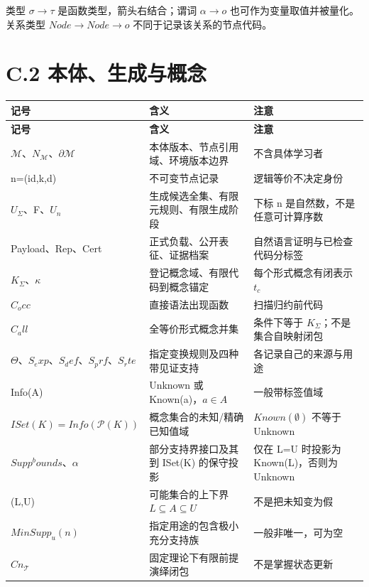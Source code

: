 \documentclass[UTF8,a4paper,zihao=-4,fontset=windows,openany]{ctexbook}
\def\mathrm#1{#1}%
\begin{document}
类型 \(\sigma\to\tau\) 是函数类型，箭头右结合；谓词 \(\alpha\to o\) 也可作为变量取值并被量化。关系类型 \(\mathrm{Node}\to\mathrm{Node}\to o\) 不同于记录该关系的节点代码。

\section{C.2 本体、生成与概念}
\begingroup\small\setlength{\tabcolsep}{4pt}
\begin{longtable}{>{\raggedright\arraybackslash}p{}>{\raggedright\arraybackslash}p{}>{\raggedright\arraybackslash}p{}}
\toprule
\textbf{记号} & \textbf{含义} & \textbf{注意} \\
\midrule
\endfirsthead
\toprule
\textbf{记号} & \textbf{含义} & \textbf{注意} \\
\midrule
\endhead
\bottomrule
\endfoot
\bottomrule
\endlastfoot
\(\mathcal{M}\)、\(N_\mathcal{M}\)、\(\partial\mathcal{M}\) & 本体版本、节点引用域、环境版本边界 & 不含具体学习者 \\
n=(id,k,d) & 不可变节点记录 & 逻辑等价不决定身份 \\
\(U_\Sigma\)、F、\(U_n\) & 生成候选全集、有限元规则、有限生成阶段 & 下标 n 是自然数，不是任意可计算序数 \\
Payload、Rep、Cert & 正式负载、公开表征、证据档案 & 自然语言证明与已检查代码分标签 \\
\(K_\Sigma\)、\(\kappa\) & 登记概念域、有限代码到概念锚定 & 每个形式概念有闭表示 \(t_c\) \\
\(C_\mathrm{occ}\) & 直接语法出现函数 & 扫描归约前代码 \\
\(C_\mathrm{all}\) & 全等价形式概念并集 & 条件下等于 \(K_\Sigma\)；不是集合自映射闭包 \\
\(\Theta\)、\(S_\mathrm{exp}\)、\(S_\mathrm{def}\)、\(S_\mathrm{prf}\)、\(S_\mathrm{rte}\) & 指定变换规则及四种带见证支持 & 各记录自己的来源与用途 \\
Info(A) & Unknown 或 Known(a)，\(a\in A\) & 一般带标签值域 \\
\(\mathrm{ISet}(K)=\mathrm{Info}(\mathcal{P}(K))\) & 概念集合的未知/精确已知值域 & \(\mathrm{Known}(\emptyset)\) 不等于 Unknown \\
\(\mathrm{Supp}^\mathrm{bounds}\)、\(\alpha\) & 部分支持界接口及其到 ISet(K) 的保守投影 & 仅在 L=U 时投影为 Known(L)，否则为 Unknown \\
(L,U) & 可能集合的上下界 \(L\subseteq A\subseteq U\) & 不是把未知变为假 \\
\(\mathrm{MinSupp}_u(n)\) & 指定用途的包含极小充分支持族 & 一般非唯一，可为空 \\
\(\mathrm{Cn}_\mathcal{T}\) & 固定理论下有限前提演绎闭包 & 不是掌握状态更新 \\
\end{longtable}
\endgroup
\end{document}
